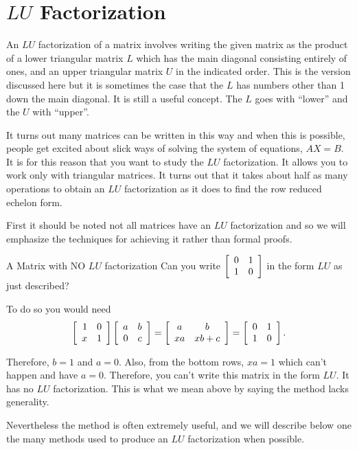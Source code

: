 \section{$LU$ Factorization}

An $LU$ factorization of a matrix involves writing the given matrix as the
product of a lower triangular matrix $L$ which has the main diagonal consisting
entirely of ones, and an upper triangular matrix $U$ in the indicated
order. This is the version discussed here but it is sometimes the case that
the $L$ has numbers other than 1 down the main diagonal. It is still a
useful concept. The $L$ goes with ``lower'' and the $U$ with ``upper''.


It turns out many matrices can be written in this way and when this is
possible, people get excited about slick ways of solving the system of
equations, $AX=B$. It is for this reason that you want to
study the $LU$ factorization. It allows you to work only with
triangular matrices. It turns out that it takes about half as many
operations to obtain an $LU$ factorization as it does to find the row
reduced echelon form.

First it should be noted not all matrices have an $LU$ factorization and so
we will emphasize the techniques for achieving it rather than formal proofs.

\begin{example}{A Matrix with NO $LU$ factorization}{}
Can you write $\left[
\begin{array}{rr}
0 & 1 \\
1 & 0
\end{array}
\right] $ in the form $LU$ as just described?
\end{example}

\begin{solution}
To do so you would need 
\begin{equation*}
\left[ 
\begin{array}{rr}
1 & 0 \\ 
x & 1
\end{array}
\right] \left[ 
\begin{array}{rr}
a & b \\ 
0 & c
\end{array}
\right] =\allowbreak \left[ 
\begin{array}{cc}
a & b \\ 
xa & xb+c
\end{array}
\right] =\left[ 
\begin{array}{rr}
0 & 1 \\ 
1 & 0
\end{array}
\right] .
\end{equation*}

Therefore, $b=1$ and $a=0.$ Also, from the bottom rows, $xa=1$ which can't
happen and have $a=0.$ Therefore, you can't write this matrix in the form $%
LU.$ It has no $LU$ factorization. This is what we mean above by saying the
method lacks generality.

Nevertheless the method is often extremely useful, and we will describe
below one the many methods used to produce an $LU$ factorization when
possible.
\end{solution}
